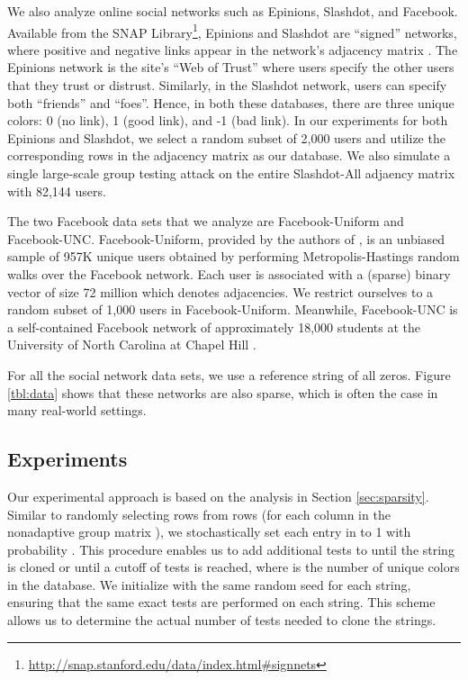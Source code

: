 \documentclass{article}
\begin{document}
We also analyze online social networks such as Epinions, Slashdot, and Facebook. 
Available from the SNAP Library\footnote{\url{http://snap.stanford.edu/data/index.html#signnets}},
Epinions and Slashdot are ``signed'' networks, where positive and 
negative links appear in the network's adjacency matrix \cite{Leskovec2010}.  The 
Epinions network is the site's ``Web of Trust'' where users specify the other users that they 
trust or distrust.  Similarly, in the Slashdot network, users can specify both ``friends'' and ``foes''.  
Hence, in both these databases, there are three unique colors: 0 (no
link), 1 (good link), and -1 (bad link).  In our experiments for both Epinions and Slashdot, 
we select a random subset of 2,000 users and utilize the corresponding rows in the adjacency matrix 
as our database.  
We also simulate a single large-scale group testing attack on the 
entire Slashdot-All adjaency matrix with 82,144 users. 
 
The two Facebook data sets that we analyze are Facebook-Uniform and Facebook-UNC.
Facebook-Uniform, provided by the authors of \cite{facebook}, is an unbiased sample
of 957K unique users obtained by performing Metropolis-Hastings random walks over the Facebook network. 
Each user is associated with a (sparse) binary vector of size 72 million which denotes adjacencies.  
We restrict ourselves to a random subset of 1,000 users in Facebook-Uniform.  Meanwhile, Facebook-UNC 
is a self-contained Facebook network of approximately 18,000 students at the 
University of North Carolina at Chapel Hill \cite{facebook2}.  

For all the social network data sets, we use a reference
string  of all zeros.
Figure \ref{tbl:data} shows that these networks are also sparse, which is often the case in many real-world settings. 

\subsection{Experiments}

Our experimental approach is based on the analysis in Section \ref{sec:sparsity}.  Similar to 
randomly selecting  rows from  rows (for each column in the nonadaptive 
group matrix ), we stochastically set each entry in  to 1 with 
probability .  This procedure enables us to add additional tests 
to  until the string is cloned or until a cutoff of  tests is reached, where
 is the number of unique colors in the database.  We initialize with the same 
random seed for each string, ensuring that the same exact tests are performed on 
each string.  This scheme allows us to determine the actual number
of tests needed to clone the strings.  
\end{document}
